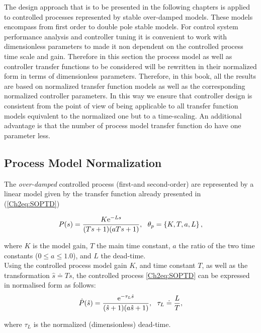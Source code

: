The design approach that is to be presented in the following chapters is applied to controlled processes represented by stable over-damped models. These models encompass from first order to double pole stable models. For control system performance analysis and controller tuning it is convenient to work with dimensionless parameters to made it non dependent on the controlled process time scale and gain. Therefore in this section the process model as well as controller transfer functions to be considered will be rewritten in their normalized form in terms of dimensionless parameters.  Therefore, in this book, all the results are based on normalized transfer function models as well as the corresponding normalized controller parameters. In this way we ensure that controller design is consistent from the point of view of being applicable to all transfer function models equivalent to the normalized one but to a time-scaling.  An additional advantage is that the number of process model transfer function do have one parameter less.

\subsection{Process Model Normalization}
\label{sec:4.1}

The \emph{over-damped} controlled process (first-and second-order) are represented by a linear model given by the transfer function already presented in (\ref{Ch2eq:SOPTD})

\begin{equation}
	P(s) = \frac{K \mathrm{e}^{-L s}}{(T s+1)(a T s+1)}, \ \ \theta_p=\left\{K, T, a, L \right\}, 
\end{equation}

\noindent where $K$ is the model gain, $T$ the main time constant, $a$ the ratio of the two time constants ($0 \leq a \leq 1.0$), and $L$ the dead-time.\\

Using the controlled process model gain $K$, and time constant $T$, as well as the transformation $\hat s \doteq T s$, the controlled process \eqref{Ch2eq:SOPTD} can be expressed in normalised form as follows:
\begin{equation}
	\hat P(\hat s) = \frac{\mathrm{e}^{-\tau_L \hat s}}{(\hat s +1)(a \hat s +1)}, \ \ \tau_L \doteq \frac{L}{T}, 
	\label{Ch2eq:SOPTD_n}
\end{equation}

\noindent where $\tau_L$ is the normalized (dimensionless) dead-time.\\

